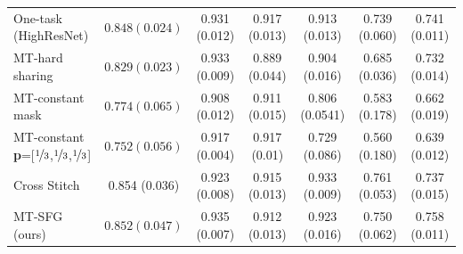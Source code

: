 \begin{table}[t!]
\begin{subtable}[t]{1.0\linewidth}
\begin{center}
\begin{tabular}{l|c|ccccc}
                \midrule
                One-task (HighResNet) \cite{wenqi} & $0.848 (0.024)$ & 0.931 (0.012)  & \cellcolor{blue!15} 0.917 (0.013)   & 0.913 (0.013) & 0.739 (0.060)  & 0.741 (0.011)  \\
                
                \multirow{1}{*}{MT-hard sharing }  & $0.829 (0.023)$ & \cellcolor{blue!15} 0.933 (0.009)  & 0.889 (0.044)    &  0.904 (0.016) & 0.685 (0.036)   &  0.732 (0.014) \\
               
                \multirow{1}{*}{MT-constant mask}  & $0.774 (0.065)$ & 0.908 (0.012)  & 0.911 (0.015)    &0.806 (0.0541)   & 0.583 (0.178)  & 0.662 (0.019) \\
                \multirow{1}{*}{MT-constant \textbf{p}=[$\nicefrac{1}{3}$,$\nicefrac{1}{3}$,$\nicefrac{1}{3}$]}   & $0.752 (0.056)$ &   0.917 (0.004)& \cellcolor{red!15} 0.917 (0.01)&0.729 (0.086)   & 0.560 (0.180)  &0.639 (0.012)\\
                 \multirow{1}{*}{Cross Stitch \cite{MisraCrossMTL16}}  &\cellcolor{red!15}  0.854 (0.036) & 0.923 (0.008)   &  0.915 (0.013) &   \cellcolor{red!15} 0.933 (0.009)  &  \cellcolor{red!15} 0.761 (0.053)   &   \cellcolor{blue!15} 0.737 (0.015)\\
                 \multirow{1}{*}{MT-SFG (ours)}  &  \cellcolor{blue!15}  $0.852 (0.047)$ &  \cellcolor{red!15} 0.935 (0.007)  & 0.912 (0.013)   &  \cellcolor{blue!15} 0.923 (0.016)  &  \cellcolor{blue!15}  0.750 (0.062) &  \cellcolor{red!15} 0.758 (0.011) \\
        \hline
        \end{tabular}
        \end{center}
    \label{tab:seg}
    \end{subtable}


\end{table}

